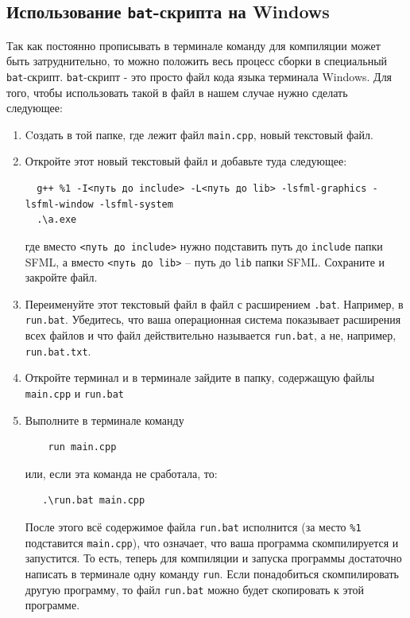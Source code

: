 \documentclass{article}
\begin{document}
\subsection*{Использование \texttt{bat}-скрипта на Windows} 
Так как постоянно прописывать в терминале команду для компиляции может быть затруднительно, то можно положить весь процесс сборки в специальный \texttt{bat}-скрипт. \texttt{bat}-скрипт - это просто файл кода языка терминала Windows. Для того, чтобы использовать такой в файл в нашем случае нужно сделать следующее:
\begin{enumerate}
\item Cоздать в той папке, где лежит файл \texttt{main.cpp}, новый текстовый файл. 

\item Откройте этот новый текстовый файл и добавьте туда следующее:
\begin{verbatim}
  g++ %1 -I<путь до include> -L<путь до lib> -lsfml-graphics -lsfml-window -lsfml-system
  .\a.exe
\end{verbatim}
где вместо \texttt{<путь до include>} нужно подставить путь до \texttt{include} папки SFML, а вместо \texttt{<путь до lib>} -- путь до \texttt{lib} папки SFML. Сохраните и закройте файл.

\item Переименуйте этот текстовый файл в файл с расширением \texttt{.bat}. Например, в \texttt{run.bat}. Убедитесь, что ваша операционная система показывает расширения всех файлов и что файл действительно называется \texttt{run.bat}, а не, например, \texttt{run.bat.txt}.

\item Откройте терминал и в терминале зайдите в папку, содержащую файлы \texttt{main.cpp} и \texttt{run.bat}

\item Выполните в терминале команду
\begin{verbatim}
    run main.cpp
\end{verbatim}
или, если эта команда не сработала, то:
\begin{verbatim}
   .\run.bat main.cpp
\end{verbatim}
После этого всё содержимое файла \texttt{run.bat} исполнится (за место \texttt{\%1} подставится \texttt{main.cpp}), что означает, что ваша программа скомпилируется и запустится. То есть, теперь для компиляции и запуска программы достаточно написать в терминале одну команду \texttt{run}. Если понадобиться скомпилировать другую программу, то файл \texttt{run.bat} можно будет скопировать к этой программе.
\end{enumerate}
\end{document}
